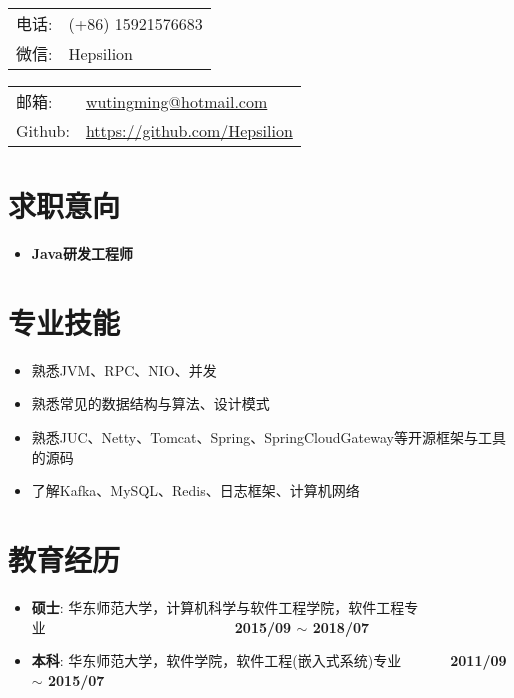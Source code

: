 \documentclass[letterpaper, UTF8, 11pt]{article}
\def\name{\textbf{\textcolor[rgb]{0.00, 0.00, 0.00}{\fontsize{30pt}{30pt}吴庭明}} ~~~~~~~~~ \fontsize{15pt}{15pt}}
\begin{document}
	
	\noindent{\bf \name} 
	\vspace{0.1in}

	\begin{minipage}{0.45\linewidth}
		\begin{tabular}{ll}
			电话:   & (+86) 15921576683 \\
			微信:   & Hepsilion \\
		\end{tabular}
	\end{minipage}
	\begin{minipage}{0.45\linewidth}
		\begin{tabular}{ll}
			邮箱:   & \href{mailto:wutingming@hotmail.com}{ wutingming@hotmail.com} \\
			Github: & \href{https://github.com/Hepsilion}{https://github.com/Hepsilion}\\
		\end{tabular}
	\end{minipage}
	\vspace{-0.1in}
	
	\section*{\textbf{求职意向}}\vspace{-0.12in}
	\begin{itemize}
		\item \textbf{Java研发工程师}
	\end{itemize}
	\vspace{-0.25in}
	
	\section*{\textbf{专业技能}}\vspace{-0.12in}
	\begin{itemize}
		\item 熟悉JVM、RPC、NIO、并发
		\item 熟悉常见的数据结构与算法、设计模式
		\item 熟悉JUC、Netty、Tomcat、Spring、SpringCloudGateway等开源框架与工具的源码
		\item 了解Kafka、MySQL、Redis、日志框架、计算机网络

	\end{itemize}
	\vspace{-0.32in}
	
	\section*{\textbf{教育经历}}\vspace{-0.12in}
	\begin{itemize}
		\item \textbf{硕士}: 华东师范大学，计算机科学与软件工程学院，软件工程专业~~~~~~~~~~~~~~~~~~~~~~~~~~~\textbf{2015/09 $\sim$ 2018/07}
		\item \textbf{本科}: 华东师范大学，软件学院，软件工程(嵌入式系统)专业~~~~~~~\textbf{2011/09 $\sim$ 2015/07}
	\end{itemize}
	\vspace{-0.32in}
	
\end{document}
